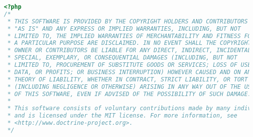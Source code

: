 \begin{lstlisting}[language=PHP]
<?php
/*
 * THIS SOFTWARE IS PROVIDED BY THE COPYRIGHT HOLDERS AND CONTRIBUTORS
 * "AS IS" AND ANY EXPRESS OR IMPLIED WARRANTIES, INCLUDING, BUT NOT
 * LIMITED TO, THE IMPLIED WARRANTIES OF MERCHANTABILITY AND FITNESS FOR
 * A PARTICULAR PURPOSE ARE DISCLAIMED. IN NO EVENT SHALL THE COPYRIGHT
 * OWNER OR CONTRIBUTORS BE LIABLE FOR ANY DIRECT, INDIRECT, INCIDENTAL,
 * SPECIAL, EXEMPLARY, OR CONSEQUENTIAL DAMAGES (INCLUDING, BUT NOT
 * LIMITED TO, PROCUREMENT OF SUBSTITUTE GOODS OR SERVICES; LOSS OF USE,
 * DATA, OR PROFITS; OR BUSINESS INTERRUPTION) HOWEVER CAUSED AND ON ANY
 * THEORY OF LIABILITY, WHETHER IN CONTRACT, STRICT LIABILITY, OR TORT
 * (INCLUDING NEGLIGENCE OR OTHERWISE) ARISING IN ANY WAY OUT OF THE USE
 * OF THIS SOFTWARE, EVEN IF ADVISED OF THE POSSIBILITY OF SUCH DAMAGE.
 *
 * This software consists of voluntary contributions made by many individuals
 * and is licensed under the MIT license. For more information, see
 * <http://www.doctrine-project.org>.
 */
 

\end{lstlisting}

